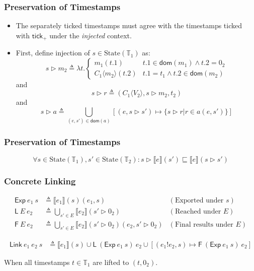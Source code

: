 \documentclass{beamer}
\newcommand*{\Time}{\mathbb{T}}
\newcommand*{\State}[1]{\text{State}({#1})}
\newcommand*{\link}[2]{{#1}\mathtt{!}{#2}}
\newcommand*{\EE}{\mathsf{Exp}}
\newcommand*{\LL}{\mathsf{L}}
\newcommand*{\Link}{\mathsf{Link}}
\newcommand*{\sembracket}[1]{\lBrack{#1}\rBrack}
\newcommand*{\tick}{\mathsf{tick}}
\newcommand*{\inject}[2]{{#1}\langle{#2}\rangle}
\begin{document}
\begin{frame}[c]
  \frametitle{Preservation of Timestamps}
  \begin{itemize}
    \item The separately ticked timestamps must agree with the timestamps ticked with $\tick_+$ under the \emph{injected} context.
    \item First, define injection of $s\in\State{\Time_1}$ as:
          \[
            s\rhd m_2\triangleq
            \lambda t.
            \begin{cases}
              m_1(t.1)               & t.1\in\mathsf{dom}(m_1)\wedge t.2=0_2 \\
              \inject{C_1}{m_2}(t.2) & t.1=t_1\wedge t.2\in\mathsf{dom}(m_2)
            \end{cases}
          \]
          and
          \[
            s\rhd r\triangleq
            (\inject{C_1}{V_2},s\rhd m_2,t_2)
          \]
          and
          \[
            {s}\rhd{a}\triangleq\bigcup_{(e,{s'})\in\mathsf{dom}({a})}[(e,{s}\rhd{s'})\mapsto\{{s}\rhd{r}|{r}\in{a}(e,{s'})\}]
          \]
  \end{itemize}
\end{frame}
\begin{frame}[c]
  \frametitle{Preservation of Timestamps}
  \begin{lemma}
    \[
      \forall s\in\State{\Time_1},s'\in\State{\Time_2}:{s}\rhd{\sembracket{e}}({s'})\sqsubseteq{\sembracket{e}}({s}\rhd{s'})
    \]
  \end{lemma}
\end{frame}
\begin{frame}[c]
  \frametitle{Concrete Linking}
  \begin{definition}
    \begin{align*}
      \EE\:e_1\:s        & \triangleq\sembracket{e_1}(s)(e_1,s)                                    & (\text{Exported under }s)      \\
      \LL\:E\:e_2        & \triangleq\bigcup_{s'\in E}\sembracket{e_2}(s'\rhd 0_2)                 & (\text{Reached under }E)       \\
      \mathsf{F}\:E\:e_2 & \triangleq\bigcup_{s'\in E}\sembracket{e_2}(s'\rhd 0_2)(e_2,s'\rhd 0_2) & (\text{Final results under }E)
    \end{align*}
  \end{definition}
  \begin{definition}
    \begin{align*}
      \Link\:e_1\:e_2\:s & \triangleq\sembracket{e_1}(s)\cup\LL\:(\EE\:e_1\:s)\:e_2\cup[(\link{e_1}{e_2},s)\mapsto\mathsf{F}\:(\EE\:e_1\:s)\:e_2]
    \end{align*}

    When all timestamps $t\in\Time_1$ are lifted to $(t,0_2)$.
  \end{definition}
\end{frame}
\end{document}
